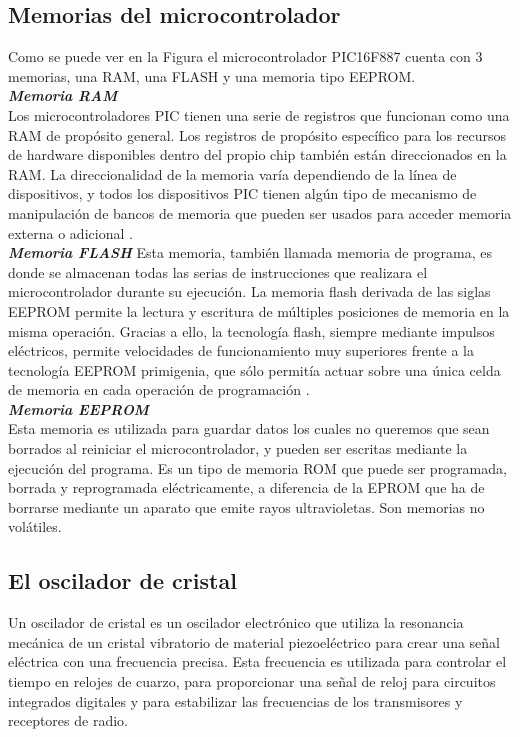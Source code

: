 \documentclass[12pt,a4paper]{article}
\begin{document}
   \subsection{Memorias del microcontrolador}
   Como se puede ver en la Figura \cite{DI} el microcontrolador PIC16F887 cuenta con 3 memorias, una RAM, una FLASH y una memoria tipo EEPROM.\\
   
   \textbf{\textit{Memoria RAM}}\\
   Los microcontroladores PIC tienen una serie de registros que funcionan como una RAM de propósito general. Los registros de propósito específico para los recursos de hardware disponibles dentro del propio chip también están direccionados en la RAM. La direccionalidad de la memoria varía dependiendo de la línea de dispositivos, y todos los dispositivos PIC tienen algún tipo de mecanismo de manipulación de bancos de memoria que pueden ser usados para acceder memoria externa o adicional \cite{CCS}.\\
   
   \textbf{\textit{Memoria FLASH}}
   Esta memoria, también llamada memoria de programa, es donde se almacenan todas las serias de instrucciones que realizara el microcontrolador durante su ejecución. La memoria flash derivada de las siglas EEPROM permite la lectura y escritura de múltiples posiciones de memoria en la misma operación. Gracias a ello, la tecnología flash, siempre mediante impulsos eléctricos, permite velocidades de funcionamiento muy superiores frente a la tecnología EEPROM primigenia, que sólo
permitía actuar sobre una única celda de memoria en cada operación de programación \cite{CCS}.\\

\textbf{\textit{Memoria EEPROM}}\\
Esta memoria es utilizada para guardar datos los cuales no queremos que sean borrados al reiniciar el microcontrolador, y pueden ser escritas mediante la ejecución del programa. Es un tipo de memoria ROM que puede ser programada, borrada y reprogramada eléctricamente, a diferencia de la EPROM que ha de borrarse mediante un aparato que emite rayos ultravioletas. Son memorias no volátiles.\\

\subsection{El oscilador de cristal}
Un oscilador de cristal es un oscilador electrónico que utiliza la resonancia mecánica de un cristal vibratorio de material piezoeléctrico para crear una señal eléctrica con una frecuencia precisa. Esta frecuencia es utilizada para controlar el tiempo en relojes de cuarzo, para proporcionar una señal de reloj para circuitos integrados digitales y para estabilizar las frecuencias de los transmisores y receptores de radio.\\
\end{document}
